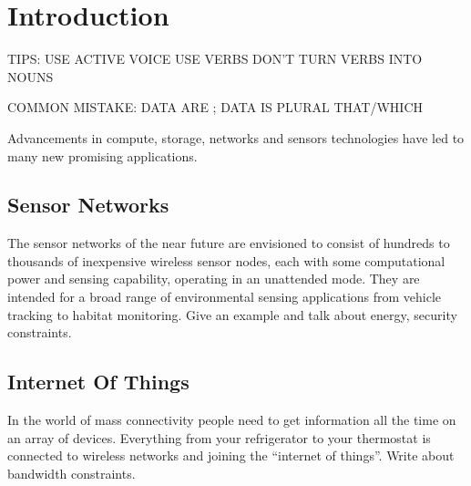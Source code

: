 %
%
%


\chapter{Introduction}

	TIPS:
		USE ACTIVE VOICE
		USE VERBS
		DON'T TURN VERBS INTO NOUNS

	COMMON MISTAKE:
		DATA ARE ; DATA IS PLURAL
		THAT/WHICH

	Advancements in compute, storage, networks and sensors technologies have led to many new promising applications. 

	\section{Sensor Networks}

		The sensor networks of the near future are envisioned
		to consist of hundreds to thousands of inexpensive
		wireless sensor nodes, each with some computational power
		and sensing capability, operating in an unattended mode.
		They are intended for a broad range of environmental sensing
		applications from vehicle tracking to habitat monitoring.
		Give an example and talk about energy, security constraints.

	\section{Internet Of Things}

		In the world of mass connectivity people need to get information all the time on an array of devices. Everything from your refrigerator to your thermostat is connected to wireless networks and joining the ``internet of things''. Write about bandwidth constraints.

